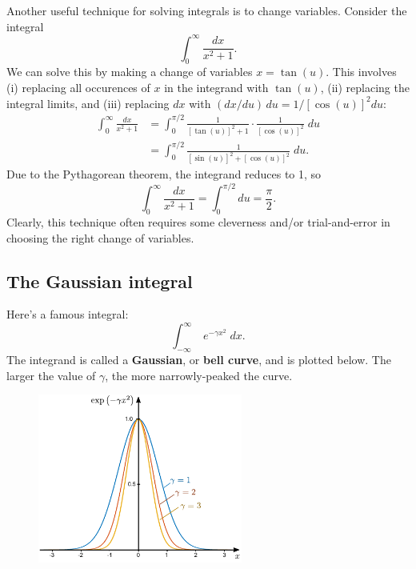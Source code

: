\documentclass[10pt,a4paper]{article}
\begin{document}
Another useful technique for solving integrals is to change variables.
Consider the integral
\begin{equation}
\int_0^\infty \frac{dx}{x^2 + 1}.
\end{equation}
We can solve this by making a change of variables $x = \tan(u)$. This
involves (i) replacing all occurences of $x$ in the integrand with
$\tan(u)$, (ii) replacing the integral limits, and (iii) replacing
$dx$ with $(dx/du) \, du = 1/[\cos(u)]^2 du$:
\begin{align}
  \int_0^\infty \frac{dx}{x^2 + 1} &= \int_0^{\pi/2} \frac{1}{[\tan(u)]^2 + 1} \cdot \frac{1}{[\cos(u)]^2} \; du \\
  &= \int_0^{\pi/2} \frac{1}{[\sin(u)]^2 + [\cos(u)]^2} \; du.
\end{align}
Due to the Pythagorean theorem, the integrand reduces to 1, so
\begin{equation}
\int_0^\infty \frac{dx}{x^2 + 1} = \int_0^{\pi/2} du = \frac{\pi}{2}.
\end{equation}
Clearly, this technique often requires some cleverness and/or
trial-and-error in choosing the right change of variables.

\subsection{The Gaussian integral}
\label{the-gaussian-integral}

Here's a famous integral:
\begin{equation}
\int_{-\infty}^\infty \; e^{-\gamma x^2} \; dx.
\end{equation}
The integrand is called a \textbf{Gaussian}, or \textbf{bell curve},
and is plotted below. The larger the value of $\gamma$, the more
narrowly-peaked the curve.

\begin{figure}[h]
  \centering\includegraphics[width=0.6\textwidth]{gaussian}
\end{figure}
    
\end{document}
